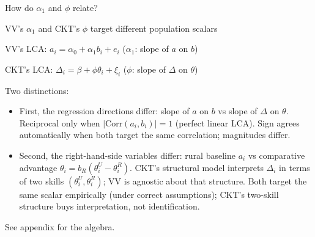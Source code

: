 \documentclass[10pt,aspectratio=169]{beamer}
\newcommand{\thetai}{\theta_{i}}
\newcommand{\Deltai}{\Delta_{i}}
\newcommand{\phicoef}{\phi}
\begin{document}
\begin{frame}[c]{}
  \centering\large
  How do $\alpha_1$ and $\phicoef$ relate?
\end{frame}

\begin{frame}{VV's $\alpha_1$ and CKT's $\phicoef$ target different population scalars}

  VV's LCA: $a_i = \alpha_0 + \alpha_1 b_i + e_i$ \qquad ($\alpha_1$: slope of $a$ on $b$)

  CKT's LCA: $\Deltai = \beta + \phicoef \thetai + \xi_i$ \qquad ($\phicoef$: slope of $\Delta$ on $\theta$)

  \vspace{0.4em}
  Two distinctions:
  \begin{itemize}
    \item First, the regression directions differ: slope of $a$ on $b$ vs slope of $\Delta$ on $\theta$.
          Reciprocal only when $|\mathrm{Corr}(a_i, b_i)| = 1$ (perfect linear LCA).
          Sign agrees automatically when both target the same correlation; magnitudes differ.
    \item Second, the right-hand-side variables differ: rural baseline $a_i$ vs comparative advantage $\thetai = b_R(\theta_i^U - \theta_i^R)$.
          CKT's structural model interprets $\Deltai$ in terms of two skills $(\theta_i^U, \theta_i^R)$; VV is agnostic about that structure.
          Both target the same scalar empirically (under correct assumptions); CKT's two-skill structure buys interpretation, not identification.
  \end{itemize}

  \vspace{0.4em}
  See appendix for the algebra.

\end{frame}
\end{document}
